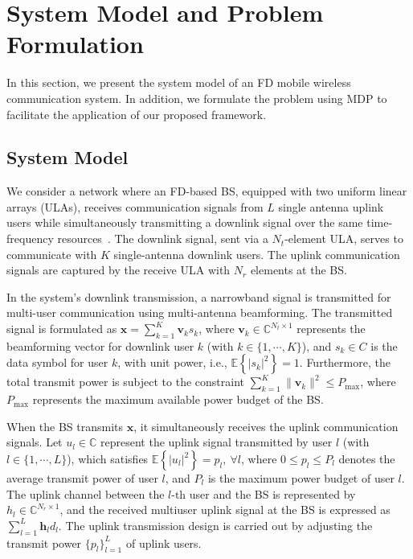 \documentclass[comsoc,journal]{IEEEtran}
\begin{document}
\section{System Model and Problem Formulation}\label{sec:system}
In this section, we present the system model of an FD mobile wireless communication system. In addition, we formulate the problem using MDP to facilitate the application of our proposed framework.
\vspace{-8pt}
\subsection{System Model}
We consider a network where an FD-based BS, equipped with two uniform linear arrays (ULAs), receives communication signals from $L$ single antenna
uplink users while simultaneously transmitting a downlink signal over the same time-frequency resources~\cite{he2023full}. The downlink signal, sent via a $N_t$-element ULA, serves to communicate with $K$ single-antenna downlink users. The uplink communication signals are captured by the receive ULA with $N_r$ elements at the BS.

In the system's downlink transmission, a narrowband signal is transmitted for multi-user communication using multi-antenna beamforming. The transmitted signal is formulated as
$ \mathbf{x} = \sum_{k=1}^{K} \mathbf{v}_k s_k$,
where $\mathbf{v}_k \in \mathbb{C}^{N_t \times 1}$ represents the beamforming vector for downlink user $k$ (with $k \in \{1, \cdots ,K\}$), and $s_k \in C$ is the data symbol for user $k$, with unit power, i.e., $\mathbb{E} \left\{ |s_k|^2 \right\} = 1$.
Furthermore, the total transmit power is subject to the constraint
$\sum_{k=1}^{K} \|\mathbf{v}_k\|^2 \leq P_{\text{max}}$, where $P_\text{max}$ represents the
maximum available power budget of the BS.

When the BS transmits $\mathbf{x}$, it simultaneously receives the uplink communication signals. Let
$u_l \in \mathbb{C}$ represent the uplink signal transmitted by user $l$ (with $l \in \{1, \cdots , L\}$),
which satisfies $\mathbb{E} \left\{ |u_l|^2 \right\} = p_l, \ \forall l$, where $0 \leq p_l \leq P_l$ denotes the average transmit power of user $l$, and $P_l$ is the maximum power budget of user $l$. The uplink channel between the $l$-$\text{th}$ user and the BS is represented by $h_l \in \mathbb{C}^{N_r \times 1}$, and the received multiuser uplink signal at the BS is expressed as $\sum_{l=1}^{L} \mathbf{h}_l d_l$. The uplink transmission design is carried out by adjusting the transmit power $\{ p_l \}_{l=1}^{L}$ of uplink users.
\end{document}
